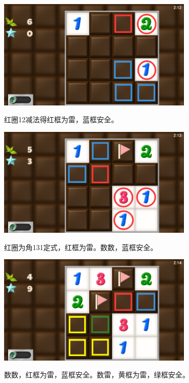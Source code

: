 \subsection{} %
\begin{center}
    \includegraphics[width=0.7\textwidth]{puzzle/27-1.png}
\end{center}
红圈12减法得红框为雷，蓝框安全。
\begin{center}
    \includegraphics[width=0.7\textwidth]{puzzle/27-2.png}
\end{center}
红圈为角131定式，红框为雷。数数，蓝框安全。
\begin{center}
    \includegraphics[width=0.7\textwidth]{puzzle/27-3.png}
\end{center}
数数，红框为雷，蓝框安全。数雷，黄框为雷，绿框安全。

